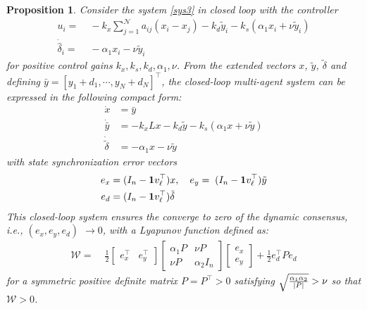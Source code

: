 \documentclass[journal,twoside]{IEEEtran}
\newtheorem{proposition}{Proposition}
\begin{document}
\begin{proposition}   \em
Consider the system \eqref{sys3} in closed loop with the controller
  \begin{align}
u_i= &\; -k_x \sum\limits_{j=1}^{\mathcal N} a_{ij} (x_i-x_j)-k_d \tilde y_i -k_s (  \alpha_1 x_i + \nu \tilde y_i) \nonumber  \\
\dot {\hat \delta}_i= &\; - \alpha_1 x_i- \nu \tilde y_i  
\label{intc3}
\end{align}
for positive control gains $k_x, k_s, k_d, \alpha_1, \nu$. %
From the extended vectors  $x$, $\tilde y$, $ \tilde \delta$ and defining $\bar y= [y_1+d_1, \cdots, y_N+d_N]^\top$, the closed-loop multi-agent system can be expressed in the following compact form:
\begin{align}
\label{tilsys3}
\dot x&= \bar y \nonumber \\
\dot {\bar y} &= -k_x L x-k_d \tilde  y  -k_s ( \alpha_1 x + \nu   \tilde  y)  \nonumber  \\
\dot {\tilde \delta} &=  -\alpha_1 x -\nu \tilde y 
\end{align}
with state synchronization error vectors
\begin{align}
\label{err3}
e_x=&\;(I_n-{\bf 1} v_\ell^\top) x, \quad e_y=\;(I_n-{\bf 1} v_\ell^\top) \tilde y \nonumber \\
e_d=&\;(I_n-{\bf 1} v_\ell^\top) \tilde \delta 
\end{align}  
This closed-loop system ensures the converge to zero of the dynamic consensus, i.e., $(e_x, e_y, e_d)$ $\to 0$, with a Lyapunov function defined as:
 \begin{align}
 \label{mW}
 {\mathcal W} =& \; \frac{1}{2}  \left[ \begin{array}{cc} e_x^\top  & e_y^\top  \end{array} \right]\left[ \begin{array}{cc} \alpha_1 P &  \nu P \\ \nu P & \alpha_2 I_n \end{array} \right]   \left[ \begin{array}{c} e_x \\ e_y  \end{array} \right] + \frac{1}{2} e_d^\top P e_d
 \end{align}
for a symmetric positive definite matrix $P=P^\top > 0$ satisfying $\sqrt{\alpha_1 \alpha_2 \over |P|}> \nu$ so that ${\mathcal W}>0$. \end{proposition}
 
\end{document}
